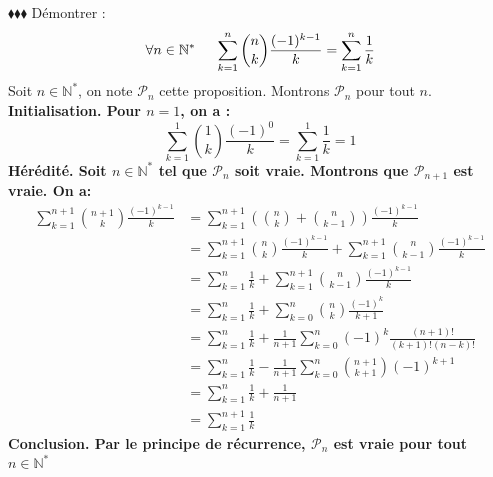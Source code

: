 \documentclass[11pt]{article}
\begin{document}
\pagebreak

\begin{exercice}{$\blacklozenge\blacklozenge\blacklozenge$}{}
    Démontrer :
    \begin{equation*}
        \forall{n\in\mathbb{N}^*}\hspace{0.5cm}\sum^n_{k=1}{\binom{n}{k}\frac{(-1)^{k-1}}{k}}=\sum^n_{k=1}{\frac{1}{k}}
    \end{equation*}
    \tcblower
    Soit $n\in\mathbb{N}^*$, on note $\mathcal{P}_n$ cette proposition. Montrons $\mathcal{P}_n$ pour tout $n$.\\
    \bf{Initialisation}. Pour $n=1$, on a :
    \begin{equation*}
        \sum^1_{k=1}{\binom{1}{k}\frac{(-1)^0}{k}}=\sum^1_{k=1}{\frac{1}{k}}=1
    \end{equation*}
    \bf{Hérédité}. Soit $n\in\mathbb{N}^*$ tel que $\mathcal{P}_n$ soit vraie. Montrons que $\mathcal{P}_{n+1}$ est vraie. On a:
    \begin{align*}
        \sum^{n+1}_{k=1}{\binom{n+1}{k}\frac{(-1)^{k-1}}{k}}
        &=\sum^{n+1}_{k=1}{\left(\binom{n}{k}+\binom{n}{k-1}\right)\frac{(-1)^{k-1}}{k}}\\
        &=\sum^{n+1}_{k=1}{\binom{n}{k}\frac{(-1)^{k-1}}{k}}+\sum^{n+1}_{k=1}{\binom{n}{k-1}\frac{(-1)^{k-1}}{k}}\\
        &=\sum^n_{k=1}{\frac{1}{k}}+\sum^{n+1}_{k=1}{\binom{n}{k-1}\frac{(-1)^{k-1}}{k}}\\
        &=\sum^n_{k=1}{\frac{1}{k}}+\sum^{n}_{k=0}{\binom{n}{k}\frac{(-1)^k}{k+1}}\\
        &=\sum^n_{k=1}{\frac{1}{k}}+\frac{1}{n+1}\sum^n_{k=0}{(-1)^k\frac{(n+1)!}{(k+1)!(n-k)!}}\\
        &=\sum^n_{k=1}{\frac{1}{k}}-\frac{1}{n+1}\sum^n_{k=0}{\binom{n+1}{k+1}(-1)^{k+1}}\\
        &=\sum^n_{k=1}{\frac{1}{k}}+\frac{1}{n+1}\\
        &=\sum^{n+1}_{k=1}{\frac{1}{k}}
    \end{align*}
    \bf{Conclusion.} Par le principe de récurrence, $\mathcal{P}_n$ est vraie pour tout $n\in\mathbb{N}^*$
\end{exercice}

\pagebreak
\end{document}
